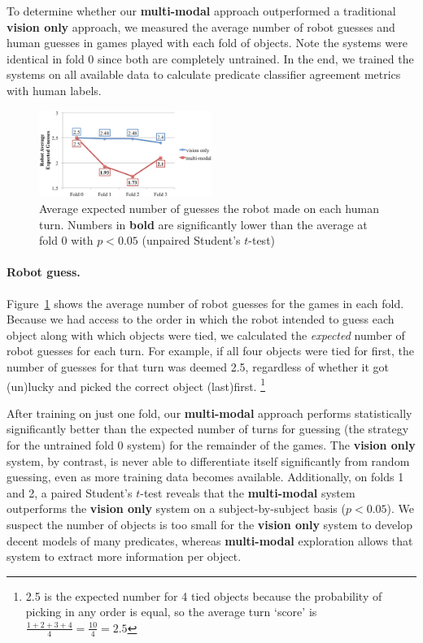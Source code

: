To determine whether our \textbf{multi-modal} approach outperformed a traditional \textbf{vision only} approach, we measured the average number of robot guesses and human guesses in games played with each fold of objects.
Note the systems were identical in fold 0 since both are completely untrained.
In the end, we trained the systems on all available data to calculate predicate classifier agreement metrics with human labels.

\begin{figure}
\centering
\includegraphics[width=0.5\textwidth]{figures/robot_guesses.png}
\caption{Average expected number of guesses the robot made on each human turn. Numbers in \textbf{bold} are significantly lower than the average at fold 0 with $p<0.05$ (unpaired Student's $t$-test)}
\label{fig:robot_guesses}
\end{figure}

\paragraph{Robot guess.}
Figure~\ref{fig:robot_guesses} shows the average number of robot guesses for the games in each fold. Because we had access to the order in which the robot intended to guess each object along with which objects were tied, we calculated the {\it expected} number of robot guesses for each turn.
For example, if all four objects were tied for first, the number of guesses for that turn was deemed 2.5, regardless of whether it got (un)lucky and picked the correct object (last)first.
\footnote{2.5 is the expected number for 4 tied objects because the probability of picking in any order is equal, so the average turn `score' is $\frac{1+2+3+4}{4} = \frac{10}{4} = 2.5$}

After training on just one fold, our \textbf{multi-modal} approach performs statistically significantly better than the expected number of turns for guessing (the strategy for the untrained fold 0 system) for the remainder of the games.
The \textbf{vision only} system, by contrast, is never able to differentiate itself significantly from random guessing, even as more training data becomes available.
Additionally, on folds 1 and 2, a paired Student's $t$-test reveals that the \textbf{multi-modal} system outperforms the \textbf{vision only} system on a subject-by-subject basis ($p<0.05$).
We suspect the number of objects is too small for the \textbf{vision only} system to develop decent models of many predicates, whereas \textbf{multi-modal} exploration allows that system to extract more information per object.

